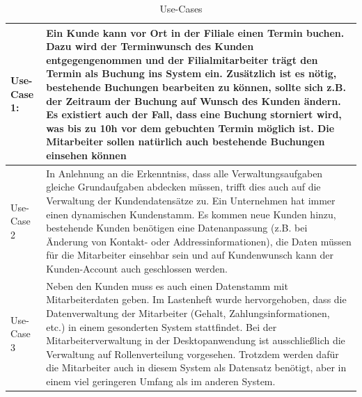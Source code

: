 \begin{table}[ht]

    \begin{onehalfspace}

    \begin{tabular}{l | p{12.5cm}}
        \hline
        Use-Case 1: & Ein Kunde kann vor Ort in der Filiale einen Termin buchen. Dazu wird der Terminwunsch des Kunden entgegengenommen und der Filialmitarbeiter trägt den Termin als Buchung ins System ein. Zusätzlich ist es nötig, bestehende Buchungen bearbeiten zu können, sollte sich z.B. der Zeitraum der Buchung auf Wunsch des Kunden ändern. Es existiert auch der Fall, dass eine Buchung storniert wird, was bis zu 10h vor dem gebuchten Termin möglich ist. Die Mitarbeiter sollen natürlich auch bestehende Buchungen einsehen können\\
        \hline
        Use-Case 2 & In Anlehnung an die Erkenntniss, dass alle Verwaltungsaufgaben gleiche Grundaufgaben abdecken müssen, trifft dies auch auf die Verwaltung der Kundendatensätze zu. Ein Unternehmen hat immer einen dynamischen Kundenstamm. Es kommen neue Kunden hinzu, bestehende Kunden benötigen eine Datenanpassung (z.B. bei Änderung von Kontakt- oder Addressinformationen), die Daten müssen für die Mitarbeiter einsehbar sein und auf Kundenwunsch kann der Kunden-Account auch geschlossen werden.\\
        \hline
        Use-Case 3 & Neben den Kunden muss es auch einen Datenstamm mit Mitarbeiterdaten geben. Im Lastenheft wurde hervorgehoben, dass die Datenverwaltung der Mitarbeiter (Gehalt, Zahlungsinformationen, etc.) in einem gesonderten System stattfindet. Bei der Mitarbeiterverwaltung in der Desktopanwendung ist ausschließlich die Verwaltung auf Rollenverteilung vorgesehen. Trotzdem werden dafür die Mitarbeiter auch in diesem System als Datensatz benötigt, aber in einem viel geringeren Umfang als im anderen System.\\
        \hline
    \end{tabular}
    \caption{Use-Cases}
    \label{tbl:usecases1}

    \end{onehalfspace}
\end{table}

\clearpage

